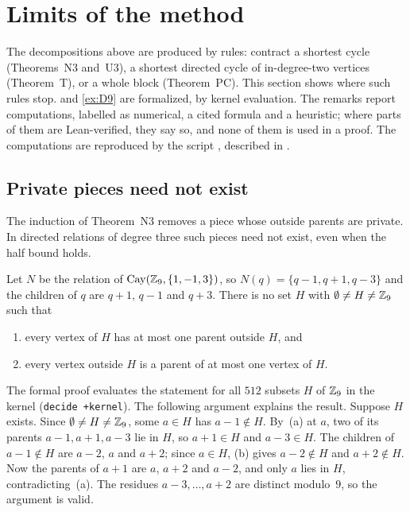 \section{Limits of the method}\label{sec:limits}

The decompositions above are produced by rules: contract a shortest cycle (Theorems~N3 and~U3), a shortest directed cycle
of in-degree-two vertices (Theorem~T), or a whole block (Theorem~PC). This section shows where such rules stop.
 and \cref{ex:D9} are formalized, by kernel evaluation. The remarks report computations,
labelled as numerical, a cited formula and a heuristic; where parts of them are Lean-verified, they say so, and none of
them is used in a proof. The computations are reproduced by the script , described in
.

\subsection{Private pieces need not exist}\label{sec:no-private}

The induction of Theorem~N3 removes a piece whose outside parents are private. In directed relations of degree three
such pieces need not exist, even when the half bound holds.

\begin{proposition}\label{prop:no-private}
Let $N$ be the relation of $\operatorname{Cay}(\mathbb{Z}_9,\{1,-1,3\})$, so $N(q)=\{q-1,q+1,q-3\}$ and the children of $q$ are $q+1$, $q-1$
and $q+3$. There is no set $H$ with $\emptyset\ne H\ne\mathbb{Z}_9$ such that
\begin{enumerate}[label=(\alph*)]
\item every vertex of $H$ has at most one parent outside $H$, and
\item every vertex outside $H$ is a parent of at most one vertex of $H$.
\end{enumerate}
\end{proposition}

\begin{outline}
The formal proof evaluates the statement for all $512$ subsets $H$ of $\mathbb{Z}_9$ in the kernel (\texttt{decide +kernel}).
The following argument explains the result. Suppose $H$ exists. Since $\emptyset\ne H\ne\mathbb{Z}_9$, some $a\in H$ has
$a-1\notin H$. By~(a) at $a$, two of its parents $a-1,a+1,a-3$ lie in $H$, so $a+1\in H$ and $a-3\in H$. The children of
$a-1\notin H$ are $a-2$, $a$ and $a+2$; since $a\in H$, (b) gives $a-2\notin H$ and $a+2\notin H$. Now the parents of
$a+1$ are $a$, $a+2$ and $a-2$, and only $a$ lies in $H$, contradicting~(a). The residues $a-3,\dots,a+2$ are distinct
modulo~$9$, so the argument is valid.
\end{outline}

